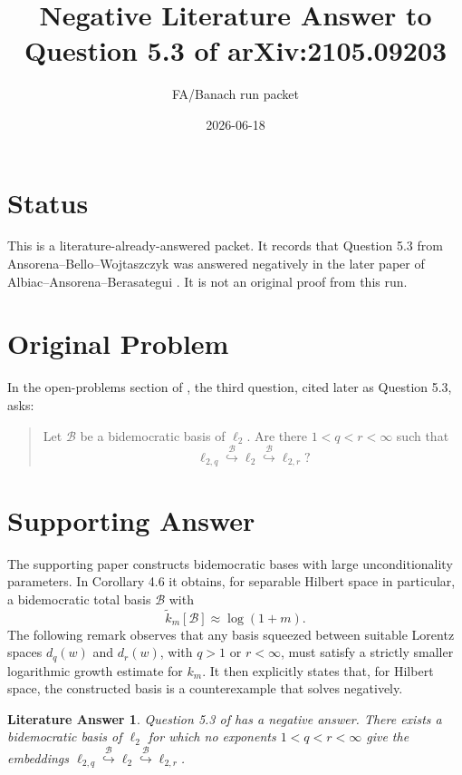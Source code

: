 \documentclass[11pt]{article}
\title{Negative Literature Answer to Question 5.3 of arXiv:2105.09203}
\author{FA/Banach run packet}
\date{2026-06-18}
\newtheorem*{theorem}{Literature Answer}
\begin{document}
\maketitle

\section*{Status}

This is a literature-already-answered packet. It records that Question 5.3
from Ansorena--Bello--Wojtaszczyk \cite{ABW} was answered negatively in the
later paper of Albiac--Ansorena--Berasategui \cite{AAB}. It is not an
original proof from this run.

\section*{Original Problem}

In the open-problems section of \cite{ABW}, the third question, cited later as
Question 5.3, asks:

\begin{quote}
Let \(\mathcal B\) be a bidemocratic basis of \(\ell_2\). Are there
\(1<q<r<\infty\) such that
\[
\ell_{2,q}\stackrel{\mathcal B}{\hookrightarrow}\ell_2
\stackrel{\mathcal B}{\hookrightarrow}\ell_{2,r}?
\]
\end{quote}

\section*{Supporting Answer}

The supporting paper \cite{AAB} constructs bidemocratic bases with large
unconditionality parameters. In Corollary 4.6 it obtains, for separable Hilbert
space in particular, a bidemocratic total basis \(\mathcal B\) with
\[
\tilde k_m[\mathcal B]\approx \log(1+m).
\]
The following remark observes that any basis squeezed between suitable Lorentz
spaces \(d_q(w)\) and \(d_r(w)\), with \(q>1\) or \(r<\infty\), must satisfy a
strictly smaller logarithmic growth estimate for \(k_m\). It then explicitly
states that, for Hilbert space, the constructed basis is a counterexample that
solves \cite[Question 5.3]{ABW} negatively.

\begin{theorem}
Question 5.3 of \cite{ABW} has a negative answer. There exists a bidemocratic
basis of \(\ell_2\) for which no exponents \(1<q<r<\infty\) give the
embeddings
\(\ell_{2,q}\stackrel{\mathcal B}{\hookrightarrow}\ell_2
\stackrel{\mathcal B}{\hookrightarrow}\ell_{2,r}\).
\end{theorem}
\end{document}

